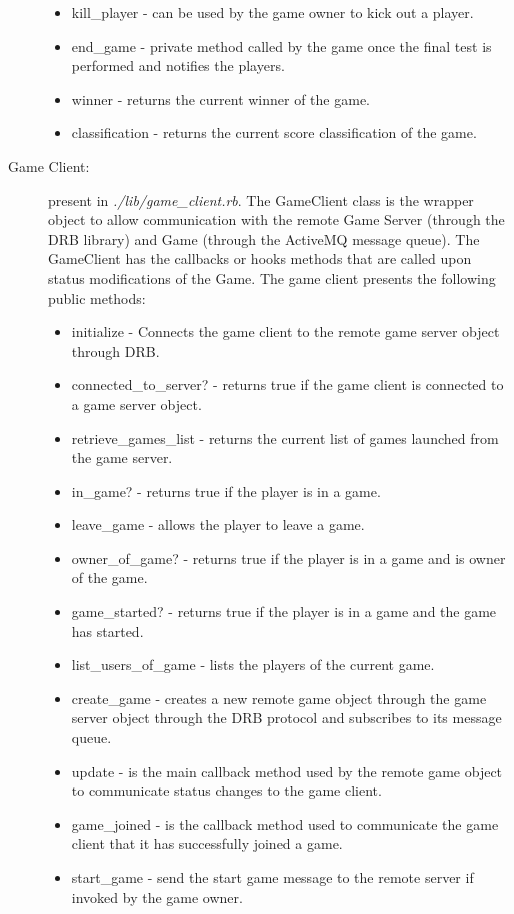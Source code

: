 \documentclass[a4paper,10pt,titlepage]{article}
\begin{document}
\begin{description}
\begin{itemize}
		\item kill\_player - can be used by the game owner to kick out a player.
		\item end\_game - private method called by the game once the final test is performed and notifies the players.
		\item winner - returns the current winner of the game.
		\item classification - returns the current score classification of the game.
	\end{itemize} 
	\item[Game Client:] present in \textit{./lib/game\_client.rb}. The GameClient class is the wrapper object to allow communication with the remote Game Server (through the DRB library) and Game (through the ActiveMQ message queue). The GameClient has the callbacks or hooks methods that are called upon status modifications of the Game. The game client presents the following public methods:
	\begin{itemize}
		\item initialize - Connects the game client to the remote game server object through DRB. 
		\item connected\_to\_server? - returns true if the game client is connected to a game server object.
		\item retrieve\_games\_list - returns the current list of games launched from the game server.
		\item in\_game? - returns true if the player is in a game.
		\item leave\_game - allows the player to leave a game.
		\item owner\_of\_game? - returns true if the player is in a game and is owner of the game.
		\item game\_started? - returns true if the player is in a game and the game has started.
		\item list\_users\_of\_game - lists the players of the current game.
		\item create\_game - creates a new remote game object through the game server object through the DRB protocol and subscribes to its message queue.
		\item update - is the main callback method used by the remote game object to communicate status changes to the game client.
		\item game\_joined - is the callback method used to communicate the game client that it has successfully joined a game. 
		\item start\_game - send the start game message to the remote server if invoked by the game owner.

\end{itemize}
\end{description}
\end{document}
